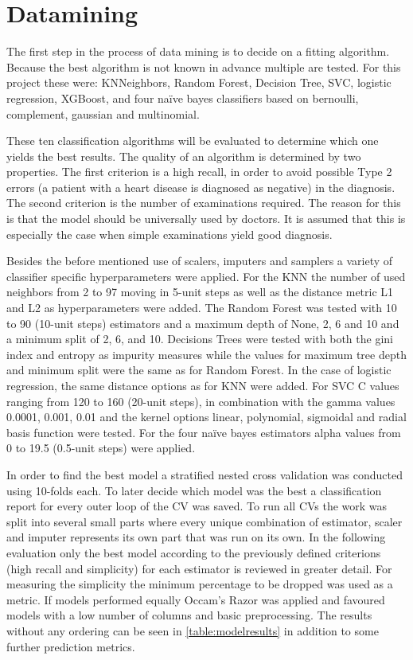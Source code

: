 \section{Datamining} \label{sec:datamining}
The first step in the process of data mining is to decide on a fitting algorithm. Because the best algorithm is not known in advance multiple are tested. For this project these were: KNNeighbors, Random Forest, Decision Tree, SVC, logistic regression, XGBoost, and four naïve bayes classifiers based on bernoulli, complement, gaussian  and multinomial.

These ten classification algorithms will be evaluated to determine which one yields the best results. The quality of an algorithm is determined by two properties. The first criterion is a high recall, in order to avoid possible Type 2 errors (a patient with a heart disease is diagnosed as negative) in the diagnosis. The second criterion is the number of examinations required. The reason for this is that the model should be universally used by doctors. It is assumed that this is especially the case when simple examinations yield good diagnosis.

Besides the before mentioned use of scalers, imputers and samplers a variety of classifier specific hyperparameters were applied. For the KNN the number of used neighbors from 2 to 97 moving in 5-unit steps as well as the distance metric L1 and L2 as hyperparameters were added. The Random Forest was tested with 10 to 90 (10-unit steps) estimators and a maximum depth of None, 2, 6 and 10 and a minimum split of 2, 6, and 10. Decisions Trees were tested with both the gini index and entropy as impurity measures while the values for maximum tree depth and minimum split were the same as for Random Forest. In the case of logistic regression, the same distance options as for KNN were added. For SVC C values ranging from 120 to 160 (20-unit steps), in combination with the gamma values 0.0001, 0.001, 0.01 and the kernel options linear, polynomial, sigmoidal and radial basis function were tested. For the four naïve bayes estimators alpha values from 0 to 19.5 (0.5-unit steps) were applied.

In order to find the best model a stratified nested cross validation was conducted using 10-folds each. To later decide which model was the best a classification report for every outer loop of the CV was saved. To run all CVs the work was split into several small parts where every unique combination of estimator, scaler and imputer represents its own part that was run on its own. In the following evaluation only the best model according to the previously defined criterions (high recall and simplicity) for each estimator is reviewed in greater detail. For measuring the simplicity the minimum percentage to be dropped was used as a metric. If models performed equally Occam's Razor was applied and favoured models with a low number of columns and basic preprocessing. The results without any ordering can be seen in \cref{table:modelresults} in addition to some further prediction metrics.


